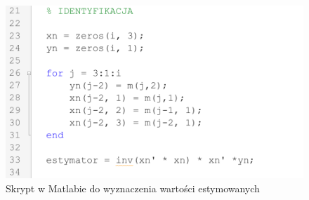\documentclass[12pt]{article}
\begin{document}
\begin{figure}[H]
    \centering
    \includegraphics[scale=0.4]{identyfikacja_skrypt.png}
    \caption{Skrypt w Matlabie do wyznaczenia wartości estymowanych}
    \label{identyfikacja_skrypt}
\end{figure}
\end{document}
